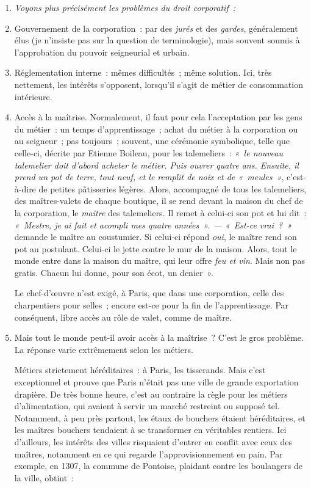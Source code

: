 \documentclass[french,twoside]{book} %
\newlength{\listmod}
\newcommand{\listhead}[1]{\hspace{-1\listmod}\emph{#1}}
\begin{document}
\begin{enumerate}[itemsep=\baselineskip,]
\item[]\listhead{Voyons plus précisément les problèmes du droit corporatif :}
\item Gouvernement de la corporation : par des \emph{jurés} et des \emph{gardes}, généralement élus (je n’insiste pas sur la question de terminologie), mais souvent soumis à l’approbation du pouvoir seigneurial et urbain.
\item Réglementation interne : mêmes difficultés ; même solution. Ici, très nettement, les intérêts s’opposent, lorsqu’il s’agit de métier de consommation intérieure.
\item  Accès à la maîtrise. Normalement, il faut pour cela l’acceptation par les gens du métier : un temps d’apprentissage ; achat du métier à la corporation ou au seigneur ; pas toujours ; souvent, une cérémonie symbolique, telle que celle-ci, décrite par Etienne Boileau, pour les talemeliers : \emph{« le nouveau talemelier doit d’abord acheter le métier. Puis ouvrer quatre ans. Ensuite, il prend un pot de terre, tout neuf, et le remplit de noix et de « meules »}, c’est-à-dire de petites pâtisseries légères. Alors, accompagné de tous les talemeliers, des maîtres-valets de chaque boutique, il se rend devant la maison du chef de la corporation, le \emph{maître} des talemeliers. Il remet à celui-ci son pot et lui dit : \emph{« Mestre, je ai fait et acompli mes quatre années ». — « Est-ce vrai ? »} demande le maître au coustumier. Si celui-ci répond \emph{oui}, le maître rend son pot au postulant. Celui-ci le jette contre le mur de la maison. Alors, tout le monde entre dans la maison du maître, qui leur offre \emph{feu et vin}. Mais non pas gratis. Chacun lui donne, pour son écot, un denier ».\par
 Le chef-d’œuvre n’est exigé, à Paris, que dans une corporation, celle des charpentiers pour selles ; encore est-ce pour la fin de l’apprentissage. Par conséquent, libre accès au rôle de valet, comme de maître.
 
\item  Mais tout le monde peut-il avoir accès à la maîtrise ? C’est le gros problème. La réponse varie extrêmement selon les métiers.\par
 Métiers strictement héréditaires : à Paris, les tisserands. Mais c’est exceptionnel et prouve que Paris n’était pas une ville de grande exportation drapière. De très bonne heure, c’est au contraire la règle pour les métiers d’alimentation, qui avaient à servir un marché restreint ou supposé tel. Notamment, à peu près partout, les étaux de bouchers étaient héréditaires, et les maîtres bouchers tendaient à se transformer en véritables rentiers. Ici d’ailleurs, les intérêts des villes risquaient d’entrer en conflit avec ceux des maîtres, notamment en ce qui regarde l’approvisionnement en pain. Par exemple, en 1307, la commune de Pontoise, plaidant contre les boulangers de la ville, obtint :\par
 

\end{enumerate}
\end{document}
